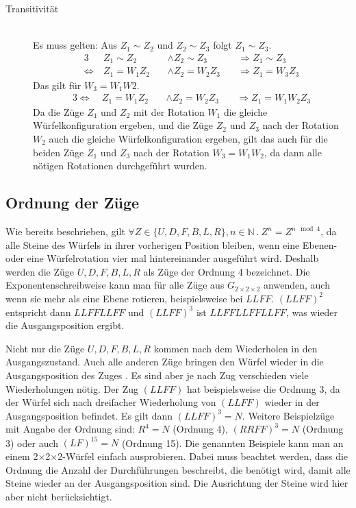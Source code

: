 \documentclass[12pt,a4paper, usenames, dvipsnames]{article}
\newcommand{\Gtwo}{\ensuremath{G_{2\times 2\times 2}}}
\newcommand{\Ttwo}{2$\times$2$\times$2-}
\begin{document}
\begin{description}
\item [Transitivität] \ \\
Es muss gelten: Aus $Z_1 \sim Z_2$ und $Z_2 \sim Z_3$ folgt $Z_1 \sim Z_3$.
\begin{alignat*}{3}
& Z_1 \sim Z_2 && \wedge Z_2 \sim Z_3 && \Rightarrow Z_1 \sim Z_3 \\
\Leftrightarrow \ & Z_1 = W_1Z_2 \ && \wedge Z_2 = W_2Z_3 \ && \Rightarrow Z_1 = W_3Z_3
\end{alignat*}
Das gilt für $W_3=W_1W2$.
\begin{alignat*}{3}
\Leftrightarrow \ & Z_1 = W_1Z_2 \ && \wedge Z_2 = W_2Z_3 \ && \Rightarrow Z_1 = W_1W_2Z_3 
\end{alignat*}
Da die Züge $Z_1$ und $Z_2$ mit der Rotation $W_1$ die gleiche Würfelkonfiguration ergeben, und die Züge $Z_2$ und $Z_3$ nach der Rotation $W_2$ auch die gleiche Würfelkonfiguration ergeben, gilt das auch für die beiden Züge $Z_1$ und $Z_3$ nach der Rotation $W_3=W_1W_2$, da dann alle nötigen Rotationen durchgeführt wurden.

\end{description}
%
%
%
%
%
%
%
%
%
%
%
%
%
%
%
%
%
%
%
%
\subsection*{Ordnung der Züge}
Wie bereits beschrieben, gilt $\forall Z \in \{ U, D, F, B, L, R \}, n \in \mathbb{N} \ . \ Z^n=Z^{n \mod 4}$, da alle Steine des Würfels in ihrer vorherigen Position bleiben, wenn eine Ebenen- oder eine Würfelrotation vier mal hintereinander ausgeführt wird. Deshalb werden die Züge $U, D, F, B, L, R$ als Züge der Ordnung 4 bezeichnet. 
Die Exponentenschreibweise kann man für alle Züge aus $\Gtwo$ anwenden, auch wenn sie mehr als eine Ebene rotieren, beispielsweise bei $LLFF$. $(LLFF)^2$ entspricht dann $LLFFLLFF$ und $(LLFF)^3$ ist $LLFFLLFFLLFF$, was wieder die Ausgangsposition ergibt. 

Nicht nur die Züge $U, D, F, B, L, R$ kommen nach dem Wiederholen in den Ausgangszustand. Auch alle anderen Züge bringen den Würfel wieder in die Ausgangsposition des Zuges \cite{TD}. Es sind aber je nach Zug verschieden viele Wiederholungen nötig. Der Zug $(LLFF)$ hat beispielsweise die Ordnung 3, da der Würfel sich nach dreifacher Wiederholung von $(LLFF)$ wieder in der Ausgangsposition befindet. Es gilt dann $(LLFF)^3 = N$.
Weitere Beispielzüge mit Angabe der Ordnung sind: ${R^4= N}$ (Ordnung 4), ${(RRFF)^3 = N}$ (Ordnung 3) oder auch ${(LF)^{15}=N}$ (Ordnung 15). 
Die genannten Beispiele kann man an einem \Ttwo Würfel einfach ausprobieren.
Dabei muss beachtet werden, dass die Ordnung die Anzahl der Durchführungen beschreibt, die benötigt wird, damit alle Steine wieder an der Ausgangsposition sind. Die Ausrichtung der Steine wird hier aber nicht berücksichtigt. 
\end{document}
